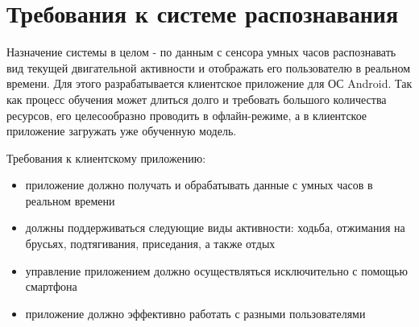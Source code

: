 
\section{Требования к системе распознавания}

Назначение системы в целом - по данным с сенсора умных часов распознавать вид текущей двигательной активности и отображать его пользователю в реальном времени. Для этого разрабатывается клиентское приложение для ОС Android. Так как процесс обучения может длиться долго и требовать большого количества ресурсов, его целесообразно проводить в офлайн-режиме, а в клиентское приложение загружать уже обученную модель.

Требования к клиентскому приложению:

\begin{itemize}
\item приложение должно получать и обрабатывать данные с умных часов в реальном времени
\item должны поддерживаться следующие виды активности: ходьба, отжимания на брусьях, подтягивания, приседания, а также отдых
\item управление приложением должно осуществляться исключительно с помощью смартфона
\item приложение должно эффективно работать с разными пользователями
\end{itemize}


